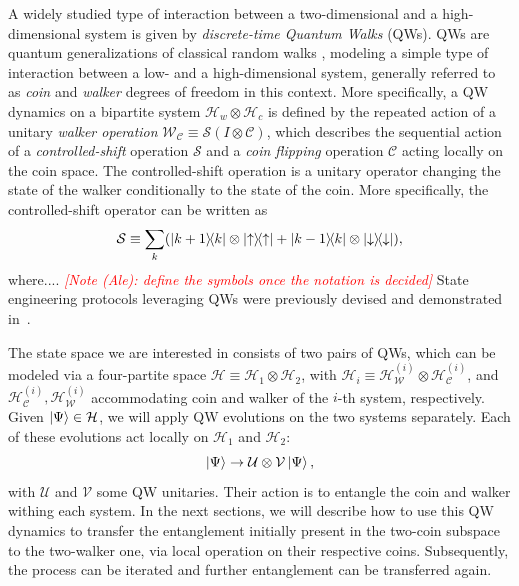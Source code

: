 \documentclass[
	aps, pra,
	superscriptaddress, twocolumn,
	floatfix,
	10pt
]{revtex4-1}
\newcommand{\parTitle}[1]{\noindent{\color{Mahogany}(\emph{#1})}}
\newcommand{\calC}{{\mathcal{C}}}
\newcommand{\calH}{{\mathcal{H}}}
\newcommand{\calS}{{\mathcal{S}}}
\newcommand{\calU}{{\mathcal{U}}}
\newcommand{\calV}{{\mathcal{V}}}
\newcommand{\calW}{{\mathcal{W}}}
\newcommand{\commale}[1]{{\textcolor{red} {\it{[Note (Ale): #1]}}}}
\begin{document}
\parTitle{Background on QWs}
A widely studied type of interaction between a two-dimensional and a high-dimensional system is given by \textit{discrete-time Quantum Walks} (QWs).
QWs are quantum generalizations of classical random walks , modeling a simple type of interaction between a low- and a high-dimensional system, generally referred to as \textit{coin} and \textit{walker} degrees of freedom in this context.
More specifically, a QW dynamics on a bipartite system $\calH_w\otimes\calH_c$ is defined by the repeated action of a unitary \textit{walker operation} $\calW_\calC\equiv \calS(I\otimes \calC)$, which describes the sequential action of a \textit{controlled-shift} operation $\calS$ and a \textit{coin flipping} operation $\calC$ acting locally on the coin space.
The controlled-shift operation is a unitary operator changing the state of the walker conditionally to the state of the coin.
More specifically, the controlled-shift operator can be written as 
\begin{equation}
    \calS \equiv \sum_k (
        \ketbra{k+1}{k}\otimes \ketbra\uparrow +
        \ketbra{k-1}{k}\otimes \ketbra\downarrow
    ),
\end{equation}
where.... \commale{define the symbols once the notation is decided}
State engineering protocols leveraging QWs were previously devised and demonstrated in~\cite{innocenti2017quantum,giordani2019experimental,giordani2020machine}.


\parTitle{Pairs of QWs}
The state space we are interested in consists of two pairs of QWs, which can be modeled via a four-partite space $\calH\equiv \calH_1\otimes\calH_2$, with
$\calH_i\equiv \calH^{(i)}_{\calW}\otimes\calH^{(i)}_{\calC}$,
and $\calH^{(i)}_{\calC}, \calH^{(i)}_{\calW}$ accommodating coin and walker of the $i$-th system, respectively.
Given $\ket\Psi\in\calH$, we will apply QW evolutions on the two systems separately. Each of these evolutions act locally on $\calH_1$ and $\calH_2$:
\begin{equation}
    \ket\Psi\to \calU\otimes\calV\ket\Psi,
\end{equation}
with $\calU$ and $\calV$ some QW unitaries. Their action is to entangle the coin and walker withing each system. In the next sections, we will describe how to use this QW dynamics to transfer the entanglement initially present in the two-coin subspace to the two-walker one, via local operation on their respective coins. Subsequently, the process can be iterated and further entanglement can be transferred again.  
\end{document}

